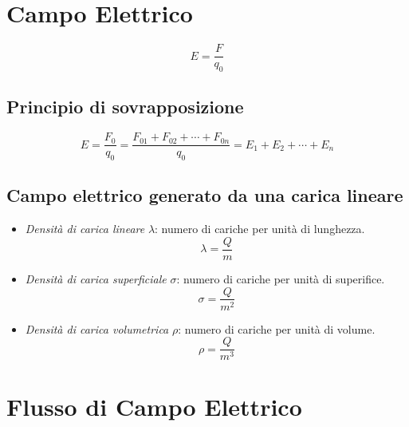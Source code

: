         \section*{Campo Elettrico}
            \begin{equation*}
                E = \frac{F}{q_0}
            \end{equation*}

            \subsection*{Principio di sovrapposizione} 
                \begin{equation*}
                    E = \frac{F_0}{q_0} = \frac{F_{01} + F_{02} + \cdots + 
                    F_{0n}}{q_0} = E_1 + E_2 + \cdots + E_n
                \end{equation*}

            \subsection*{Campo elettrico generato da una carica lineare} 
            \begin{itemize}
                \item \textit{Densità di carica lineare} $\lambda$: numero di 
                cariche per unità di lunghezza.\\
                    \begin{equation*}
                        \lambda = \frac{Q}{m}
                    \end{equation*}
                \item \textit{Densità di carica superficiale} $\sigma$: numero 
                di cariche per unità di superifice.\\
                    \begin{equation*}
                        \sigma = \frac{Q}{m^2}
                    \end{equation*}
                \item \textit{Densità di carica volumetrica} $\rho$: numero
                di cariche per unità di volume.\\
                    \begin{equation*}
                        \rho = \frac{Q}{m^3}
                    \end{equation*}
            \end{itemize}

        \section*{Flusso di Campo Elettrico}
